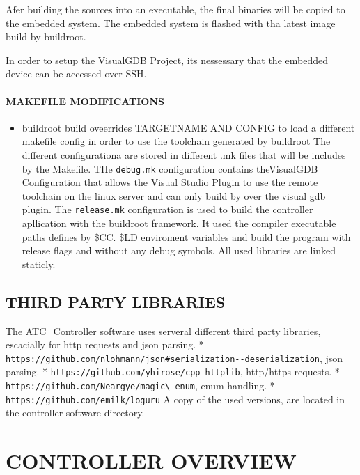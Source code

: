 Afer building the sources into an executable, the final binaries will be
copied to the embedded system. The embedded system is flashed with tha
latest image build by buildroot.

In order to setup the VisualGDB Project, its nessessary that the
embedded device can be accessed over SSH.

\hypertarget{makefile-modifications}{%
\paragraph{MAKEFILE MODIFICATIONS}\label{makefile-modifications}}

\begin{itemize}
\tightlist
\item
  buildroot build oveerrides TARGETNAME AND CONFIG to load a different
  makefile config in order to use the toolchain generated by buildroot
  The different configurationa are stored in different .mk files that
  will be includes by the Makefile. THe
  \passthrough{\lstinline!debug.mk!} configuration contains theVisualGDB
  Configuration that allows the Visual Studio Plugin to use the remote
  toolchain on the linux server and can only build by over the visual
  gdb plugin. The \passthrough{\lstinline!release.mk!} configuration is
  used to build the controller apllication with the buildroot framework.
  It used the compiler executable paths defines by \$CC. \$LD enviroment
  variables and build the program with release flags and without any
  debug symbols. All used libraries are linked staticly.
\end{itemize}

\hypertarget{third-party-libraries}{%
\subsection{THIRD PARTY LIBRARIES}\label{third-party-libraries}}

The ATC\_Controller software uses serveral different third party
libraries, escacially for http requests and json parsing. *
\passthrough{\lstinline!https://github.com/nlohmann/json#serialization--deserialization!},
json parsing. *
\passthrough{\lstinline!https://github.com/yhirose/cpp-httplib!},
http/https requests. *
\passthrough{\lstinline!https://github.com/Neargye/magic\_enum!}, enum
handling. * \passthrough{\lstinline!https://github.com/emilk/loguru!} A
copy of the used versions, are located in the controller software
directory.

\hypertarget{controller-overview}{%
\section{CONTROLLER OVERVIEW}\label{controller-overview}}

